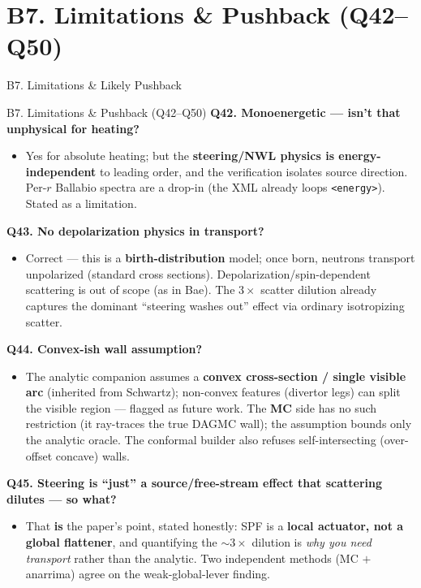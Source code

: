 \documentclass[11pt,aspectratio=169]{beamer}
\newcommand{\qitem}[1]{\medskip\textbf{#1}\par}
\begin{document}
\section{B7. Limitations \& Pushback (Q42--Q50)}
\begin{frame}
\centering\vfill
{\Large\color{key} B7. Limitations \& Likely Pushback}\par
{}
\vfill
\end{frame}

\begin{frame}[allowframebreaks]{B7. Limitations \& Pushback (Q42--Q50)}
\small
\qitem{Q42. Monoenergetic --- isn't that unphysical for heating?}
\begin{itemize}
\item Yes for absolute heating; but the \textbf{steering/NWL physics is energy-independent} to
      leading order, and the verification isolates source direction. Per-$r$ Ballabio spectra
      are a drop-in (the XML already loops \texttt{<energy>}). Stated as a limitation.
\end{itemize}

\qitem{Q43. No depolarization physics in transport?}
\begin{itemize}
\item Correct --- this is a \textbf{birth-distribution} model; once born, neutrons transport
      unpolarized (standard cross sections). Depolarization/spin-dependent scattering is out of
      scope (as in Bae). The $3\times$ scatter dilution already captures the dominant
      ``steering washes out'' effect via ordinary isotropizing scatter.
\end{itemize}

\qitem{Q44. Convex-ish wall assumption?}
\begin{itemize}
\item The analytic companion assumes a \textbf{convex cross-section / single visible arc}
      (inherited from Schwartz); non-convex features (divertor legs) can split the visible
      region --- flagged as future work. The \textbf{MC} side has no such restriction (it
      ray-traces the true DAGMC wall); the assumption bounds only the analytic oracle. The
      conformal builder also refuses self-intersecting (over-offset concave) walls.
\end{itemize}

\framebreak
\qitem{Q45. Steering is ``just'' a source/free-stream effect that scattering dilutes --- so what?}
\begin{itemize}
\item That \textbf{is} the paper's point, stated honestly: SPF is a \textbf{local actuator, not
      a global flattener}, and quantifying the $\sim 3\times$ dilution is \emph{why you need
      transport} rather than the analytic. Two independent methods (MC $+$ anarrima) agree on
      the weak-global-lever finding.
\end{itemize}


\end{frame}
\end{document}
